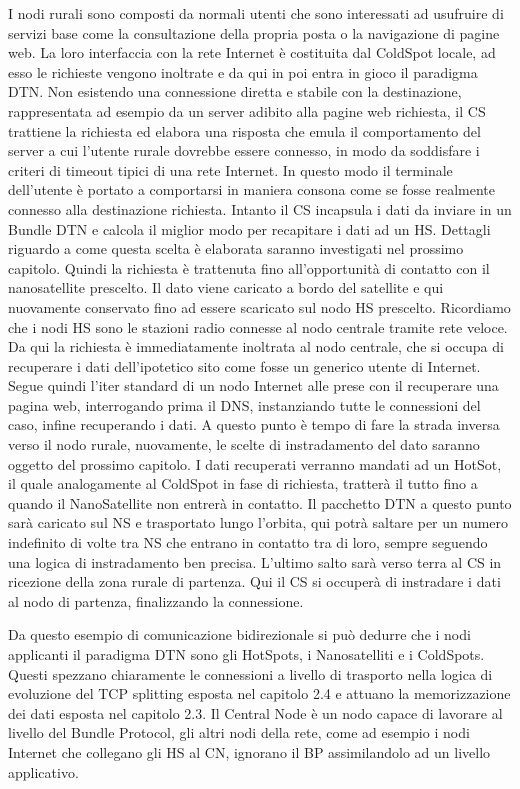 \documentclass[a4paper]{article}
\begin{document}
		I nodi rurali sono composti da normali utenti che sono interessati ad usufruire di servizi base come la consultazione della propria posta o la navigazione di pagine web. La loro interfaccia con la rete Internet è costituita dal ColdSpot locale, ad esso le richieste vengono inoltrate e da qui in poi entra in gioco il paradigma DTN. Non esistendo una connessione diretta e stabile con la destinazione, rappresentata ad esempio da un server adibito alla pagine web richiesta, il CS trattiene la richiesta ed elabora una risposta che emula il comportamento del server a cui l'utente rurale dovrebbe essere connesso, in modo da soddisfare i criteri di timeout tipici di una rete Internet. In questo modo il terminale dell'utente è portato a comportarsi in maniera consona come se fosse realmente connesso alla destinazione richiesta. Intanto il CS incapsula i dati da inviare in un Bundle DTN e calcola il miglior modo per recapitare i dati ad un HS. Dettagli riguardo a come questa scelta è elaborata saranno investigati nel prossimo capitolo. Quindi la richiesta è trattenuta fino all'opportunità di contatto con il nanosatellite prescelto. Il dato viene caricato a bordo del satellite e qui nuovamente conservato fino ad essere scaricato sul nodo HS prescelto. Ricordiamo che i nodi HS sono le stazioni radio connesse al nodo centrale tramite rete veloce. Da qui la richiesta è immediatamente inoltrata al nodo centrale, che si occupa di recuperare i dati dell'ipotetico sito come fosse un generico utente di Internet. Segue quindi l'iter standard di un nodo Internet alle prese con il recuperare una pagina web, interrogando prima il DNS, instanziando tutte le connessioni del caso, infine recuperando i dati. A questo punto è tempo di fare la strada inversa verso il nodo rurale, nuovamente, le scelte di instradamento del dato saranno oggetto del prossimo capitolo. I dati recuperati verranno mandati ad un HotSot, il quale analogamente al ColdSpot in fase di richiesta, tratterà il tutto fino a quando il NanoSatellite non entrerà in contatto. Il pacchetto DTN a questo punto sarà caricato sul NS e trasportato lungo l'orbita, qui potrà saltare per un numero indefinito di volte tra NS che entrano in contatto tra di loro, sempre seguendo una logica di instradamento ben precisa. L'ultimo salto sarà verso terra al CS in ricezione della zona rurale di partenza. Qui il CS si occuperà di instradare i dati al nodo di partenza, finalizzando la connessione.
		
		Da questo esempio di comunicazione bidirezionale si può dedurre che i nodi applicanti il paradigma DTN sono gli HotSpots, i Nanosatelliti e i ColdSpots. Questi spezzano chiaramente le connessioni a livello di trasporto nella logica di evoluzione del TCP splitting esposta nel capitolo 2.4 e attuano la memorizzazione dei dati esposta nel capitolo 2.3. Il Central Node è un nodo capace di lavorare al livello del Bundle Protocol, gli altri nodi della rete, come ad esempio i nodi Internet che collegano gli HS al CN, ignorano il BP assimilandolo ad un livello applicativo. 
	
\end{document}
